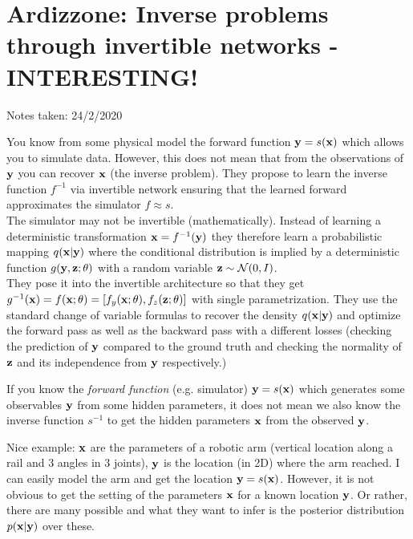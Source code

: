 \clearpage 

\section{Ardizzone: Inverse problems through invertible networks - INTERESTING!}\label{sec:inverseProblem}

\begin{notebox}

\hfill Notes taken: 24/2/2020 
\end{notebox}

\begin{notebox}
\tldr You know from some physical model the forward function $\mathbf{y} = s(\mathbf{x})$ which allows you to simulate data. However, this does not mean that from the observations of $\mathbf{y}$ you can recover $\mathbf{x}$ (the inverse problem). They propose to learn the inverse function $f^{-1}$ via invertible network ensuring that the learned forward approximates the simulator $f \approx s$. \\

The simulator may not be invertible (mathematically). Instead of learning a deterministic transformation $\mathbf{x} = f^{-1}(\mathbf{y})$ they therefore learn a probabilistic mapping $q(\mathbf{x}| \mathbf{y})$ where the conditional distribution is implied by a deterministic function $g(\mathbf{y}, \mathbf{z}; \theta)$ with a random variable $\mathbf{z} \sim \mathcal{N}(0, I)$. \\

They pose it into the invertible architecture so that they get $g^{-1}(\mathbf{x}) = f(\mathbf{x}; \theta) = [f_y(\mathbf{x}; \theta), f_z(\mathbf{z}; \theta)]$ with single parametrization. They use the standard change of variable formulas to recover the density $q(\mathbf{x}| \mathbf{y})$ and optimize the forward pass as well as the backward pass with a different losses (checking the prediction of $\mathbf{y}$ compared to the ground truth and checking the normality of $\mathbf{z}$ and its independence from $\mathbf{y}$ respectively.)
\end{notebox}

If you know the \emph{forward function} (e.g. simulator) $\mathbf{y} = s(\mathbf{x})$ which generates some observables $\mathbf{y}$ from some hidden parameters, it does not mean we also know the inverse function $s^{-1}$ to get the hidden parameters $\mathbf{x}$ from the observed $\mathbf{y}$.

Nice example: $\mathbf{x}$ are the parameters of a robotic arm (vertical location along a rail and 3 angles in 3 joints), $\mathbf{y}$ is the location (in 2D) where the arm reached. I can easily model the arm and get the location $\mathbf{y} = s(\mathbf{x})$. However, it is not obvious to get the setting of the parameters $\mathbf{x}$ for a known location $\mathbf{y}$. Or rather, there are many possible and what they want to infer is the posterior distribution $p(\mathbf{x} | \mathbf{y})$ over these. 

